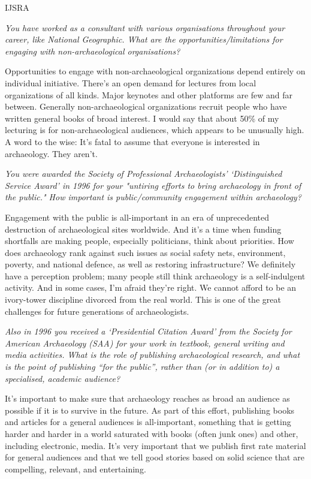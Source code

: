 \begin{labeling}{IJSRA}
\item[IJSRA] \textit{You have worked as a consultant with various organisations throughout your career, like National Geographic. What are the opportunities/limitations for engaging with non-archaeological organisations?}

\item[BMF] Opportunities to engage with non-archaeological organizations depend entirely on individual initiative. There’s an open demand for lectures from local organizations of all kinds. Major keynotes and other platforms are few and far between. Generally non-archaeological organizations recruit people who have written general books of broad interest. I would say that about 50\% of my lecturing is for non-archaeological audiences, which appears to be unusually high. A word to the wise: It’s fatal to assume that everyone is interested in archaeology. They aren’t.
                
\item[IJSRA] \textit{You were awarded the Society of Professional Archaeologists' ‘Distinguished Service Award’ in 1996 for your "untiring efforts to bring archaeology in front of the public." How important is public/community engagement within archaeology?}

\item[BMF] Engagement with the public is all-important in an era of unprecedented destruction of archaeological sites worldwide. And it’s a time when funding shortfalls are making people, especially politicians, think about priorities. How does archaeology rank against such issues as social safety nets, environment, poverty, and national defence, as well as restoring infrastructure? We definitely have a perception problem; many people still think archaeology is a self-indulgent activity. And in some cases, I’m afraid they’re right. We cannot afford to be an ivory-tower discipline divorced from the real world. This is one of the great challenges for future generations of archaeologists.

\item[IJSRA] \textit{Also in 1996 you received a ‘Presidential Citation Award’ from the Society for American Archaeology (SAA) for your work in textbook, general writing and media activities. What is the role of publishing archaeological research, and what is the point of publishing “for the public”, rather than (or in addition to) a specialised, academic audience?}

\item[BMF] It’s important to make sure that archaeology reaches as broad an audience as possible if it is to survive in the future. As part of this effort, publishing books and articles for a general audiences is all-important, something that is getting harder and harder in a world saturated with books (often junk ones) and other, including electronic, media. It’s very important that we publish first rate material for general audiences and that we tell good stories based on solid science that are compelling, relevant, and entertaining.


\end{labeling}
